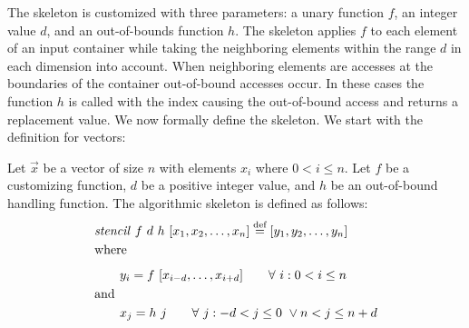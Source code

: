 The \stencil skeleton is customized with three parameters: a unary function $f$, an integer value $d$, and an out-of-bounds function $h$.
The skeleton applies $f$ to each element of an input container while taking the neighboring elements within the range $d$ in each dimension into account.
When neighboring elements are accesses at the boundaries of the container out-of-bound accesses occur.
In these cases the function $h$ is called with the index causing the out-of-bound access and returns a replacement value.
We now formally define the \stencil skeleton. We start with the definition for vectors:
\begin{definition}
  \label{definition:mapoverlap}
  Let $\vec{x}$ be a vector of size $n$ with elements $x_i$ where $0 < i \leq n$.
  Let $f$ be a customizing function, $d$ be a positive integer value, and $h$ be an out-of-bound handling function.
  The algorithmic skeleton \stencil is defined as follows:
  \begin{equation*}
    \begin{split}
    &\stencil\ f\  d\ h\ [x_1, x_2, \ldots, x_n] \eqdef [y_1, y_2, \dots, y_n]\\
    &\text{where}\\[.5em]
    &\qquad y_i = f\ [x_{i-d}, \ldots, x_{i+d}] \qquad \forall\ i :  0 < i \leq n\\
    &\text{and\hfill}\\
    &\qquad x_j = h\ j \qquad \forall\ j : -d < j \leq 0\ \vee n < j \leq n+d
    \end{split}
  \end{equation*}
\end{definition}

